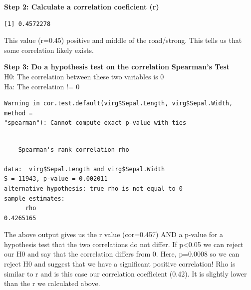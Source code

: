 \documentclass[
  letterpaper,
  DIV=11,
  numbers=noendperiod]{scrartcl}
\newenvironment{Shaded}{\begin{snugshade}}{\end{snugshade}}
\newcommand{\AttributeTok}[1]{\textcolor[rgb]{0.40,0.45,0.13}{#1}}
\newcommand{\FunctionTok}[1]{\textcolor[rgb]{0.28,0.35,0.67}{#1}}
\newcommand{\NormalTok}[1]{\textcolor[rgb]{0.00,0.23,0.31}{#1}}
\newcommand{\SpecialCharTok}[1]{\textcolor[rgb]{0.37,0.37,0.37}{#1}}
\newcommand{\StringTok}[1]{\textcolor[rgb]{0.13,0.47,0.30}{#1}}
\begin{document}
\hfill\break
\textbf{Step 2: Calculate a correlation coeficient (r)}

\begin{Shaded}
\end{Shaded}

\begin{verbatim}
[1] 0.4572278
\end{verbatim}

This value (r=0.45) positive and middle of the road/strong. This tells
us that some correlation likely exists.

\textbf{Step 3: Do a hypothesis test on the correlation}
\textbf{Spearman's Test}\\
H0: The correlation between these two variables is 0\\
Ha: The correlation != 0\\

\begin{Shaded}
\end{Shaded}

\begin{verbatim}
Warning in cor.test.default(virg$Sepal.Length, virg$Sepal.Width, method =
"spearman"): Cannot compute exact p-value with ties
\end{verbatim}

\begin{verbatim}

    Spearman's rank correlation rho

data:  virg$Sepal.Length and virg$Sepal.Width
S = 11943, p-value = 0.002011
alternative hypothesis: true rho is not equal to 0
sample estimates:
      rho 
0.4265165 
\end{verbatim}

The above output gives us the r value (cor=0.457) AND a p-value for a
hypothesis test that the two correlations do not differ. If
p\textless0.05 we can reject our H0 and say that the correlation differs
from 0. Here, p=0.0008 so we can reject H0 and suggest that we have a
significant positive correlation! Rho is similar to r and is this case
our correlation coefficient (0.42). It is slightly lower than the r we
calculated above.
\end{document}
